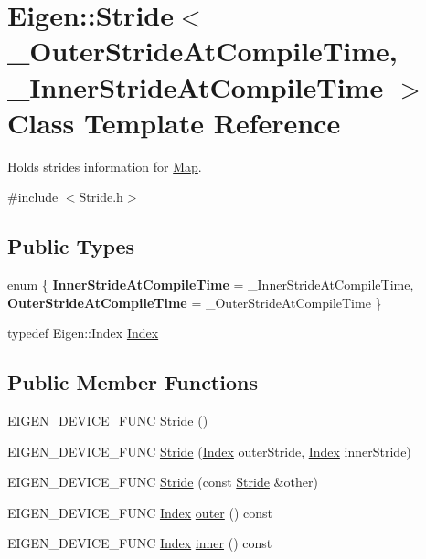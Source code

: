 \hypertarget{class_eigen_1_1_stride}{}\section{Eigen\+::Stride$<$ \+\_\+\+Outer\+Stride\+At\+Compile\+Time, \+\_\+\+Inner\+Stride\+At\+Compile\+Time $>$ Class Template Reference}
\label{class_eigen_1_1_stride}


Holds strides information for \mbox{\hyperlink{class_eigen_1_1_map}{Map}}.  




{\ttfamily \#include $<$Stride.\+h$>$}

\subsection*{Public Types}
\begin{DoxyCompactItemize}
\item 
\mbox{\label{class_eigen_1_1_stride_a8b0626d80cd2f2535f25a75ad8bbc7f3}} 
enum \{ {\bfseries Inner\+Stride\+At\+Compile\+Time} = \+\_\+\+Inner\+Stride\+At\+Compile\+Time, 
{\bfseries Outer\+Stride\+At\+Compile\+Time} = \+\_\+\+Outer\+Stride\+At\+Compile\+Time
 \}
\item 
typedef Eigen\+::\+Index \mbox{\hyperlink{class_eigen_1_1_stride_a96c2dfb0ce43fd8e19adcdf6094f5f63}{Index}}
\end{DoxyCompactItemize}
\subsection*{Public Member Functions}
\begin{DoxyCompactItemize}
\item 
E\+I\+G\+E\+N\+\_\+\+D\+E\+V\+I\+C\+E\+\_\+\+F\+U\+NC \mbox{\hyperlink{class_eigen_1_1_stride_a8c5d1654633a1ce2c655a0e94ee975f0}{Stride}} ()
\item 
E\+I\+G\+E\+N\+\_\+\+D\+E\+V\+I\+C\+E\+\_\+\+F\+U\+NC \mbox{\hyperlink{class_eigen_1_1_stride_ab769b5a97db488b06bf305f4ab970189}{Stride}} (\mbox{\hyperlink{class_eigen_1_1_stride_a96c2dfb0ce43fd8e19adcdf6094f5f63}{Index}} outer\+Stride, \mbox{\hyperlink{class_eigen_1_1_stride_a96c2dfb0ce43fd8e19adcdf6094f5f63}{Index}} inner\+Stride)
\item 
E\+I\+G\+E\+N\+\_\+\+D\+E\+V\+I\+C\+E\+\_\+\+F\+U\+NC \mbox{\hyperlink{class_eigen_1_1_stride_a052fed680cf28ea284714be591bfbf86}{Stride}} (const \mbox{\hyperlink{class_eigen_1_1_stride}{Stride}} \&other)
\item 
E\+I\+G\+E\+N\+\_\+\+D\+E\+V\+I\+C\+E\+\_\+\+F\+U\+NC \mbox{\hyperlink{class_eigen_1_1_stride_a96c2dfb0ce43fd8e19adcdf6094f5f63}{Index}} \mbox{\hyperlink{class_eigen_1_1_stride_a261eede5809599db183b49bc274f8a07}{outer}} () const
\item 
E\+I\+G\+E\+N\+\_\+\+D\+E\+V\+I\+C\+E\+\_\+\+F\+U\+NC \mbox{\hyperlink{class_eigen_1_1_stride_a96c2dfb0ce43fd8e19adcdf6094f5f63}{Index}} \mbox{\hyperlink{class_eigen_1_1_stride_a24579b0e941cebef474c666e6d936b3b}{inner}} () const
\end{DoxyCompactItemize}
